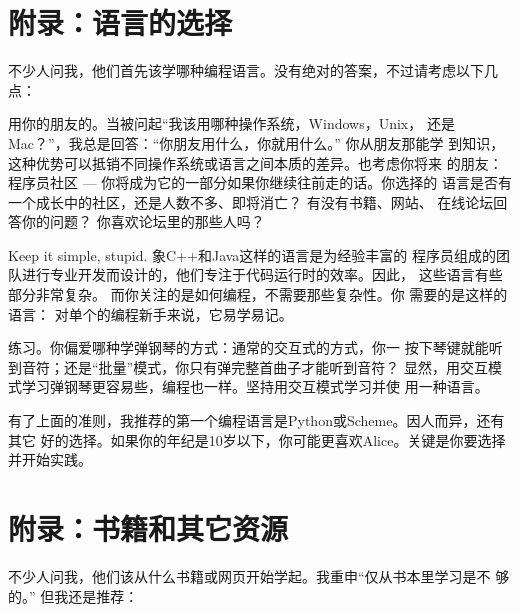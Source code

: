 \section{附录：语言的选择}

不少人问我，他们首先该学哪种编程语言。没有绝对的答案，不过请考虑以下几 点：


\begin{compactitem}
\item 用你的朋友的。当被问起“我该用哪种操作系统，Windows，Unix， 还是Mac？”，我总是回答：“你朋友用什么，你就用什么。” 你从朋友那能学 到知识，这种优势可以抵销不同操作系统或语言之间本质的差异。也考虑你将来 的朋友：程序员社区 — 你将成为它的一部分如果你继续往前走的话。你选择的 语言是否有一个成长中的社区，还是人数不多、即将消亡？ 有没有书籍、网站、 在线论坛回答你的问题？ 你喜欢论坛里的那些人吗？
\item Keep it simple, stupid. 象C++和Java这样的语言是为经验丰富的 程序员组成的团队进行专业开发而设计的，他们专注于代码运行时的效率。因此， 这些语言有些部分非常复杂。 而你关注的是如何编程，不需要那些复杂性。你 需要的是这样的语言： 对单个的编程新手来说，它易学易记。
\item 练习。你偏爱哪种学弹钢琴的方式：通常的交互式的方式，你一 按下琴键就能听到音符；还是“批量”模式，你只有弹完整首曲子才能听到音符？ 显然，用交互模式学习弹钢琴更容易些，编程也一样。坚持用交互模式学习并使 用一种语言。

\end{compactitem}

有了上面的准则，我推荐的第一个编程语言是Python或Scheme。因人而异，还有其它 好的选择。如果你的年纪是10岁以下，你可能更喜欢Alice。关键是你要选择并开始实践。

\section{附录：书籍和其它资源}


不少人问我，他们该从什么书籍或网页开始学起。我重申“仅从书本里学习是不 够的。” 但我还是推荐：

